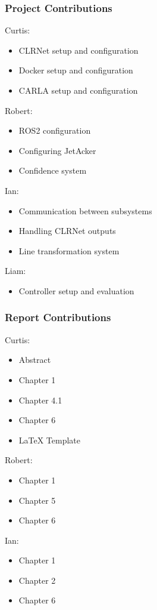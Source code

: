\documentclass[titlepage,draft]{article}
\begin{document}
\subsubsection{Project Contributions}

Curtis:
\begin{itemize}
	\item CLRNet setup and configuration
	\item Docker setup and configuration
	\item CARLA setup and configuration
\end{itemize}

Robert:
\begin{itemize}
	\item ROS2 configuration
	\item Configuring JetAcker
	\item Confidence system
\end{itemize}

Ian:
\begin{itemize}
	\item Communication between subsystems
	\item Handling CLRNet outputs
	\item Line transformation system
\end{itemize}

Liam:
\begin{itemize}
	\item Controller setup and evaluation
\end{itemize}


\subsubsection{Report Contributions}
Curtis:
\begin{itemize}
	\item Abstract
	\item Chapter 1
	\item Chapter 4.1
	\item Chapter 6
	\item LaTeX Template
\end{itemize}

Robert:
\begin{itemize}
	\item Chapter 1
	\item Chapter 5
	\item Chapter 6
\end{itemize}

Ian:
\begin{itemize}
	\item Chapter 1
	\item Chapter 2
	\item Chapter 6
\end{itemize}
\end{document}
